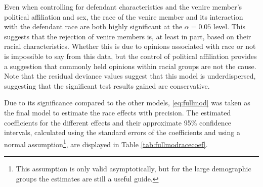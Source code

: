 Even when controlling for defendant characteristics and the venire member's political affiliation and sex, the race of the venire
member and its interaction with the defendant race are both highly significant at the $\alpha = 0.05$ level. This suggests that
the rejection of venire members is, at least in part, based on their racial characteristics. Whether this is due to opinions
associated with race or not is impossible to say from this data, but the control of political affiliation provides a suggestion
that commonly held opinions within racial groups are not the cause. Note that the residual deviance values suggest that this model
is underdispersed, suggesting that the significant test results gained are conservative.

Due to its significance compared to the other models, \ref{eq:fullmod} was taken as the final model to estimate the race effects
with precision. The estimated coefficients for the different effects and their approximate 95\% confidence intervals, calculated
using the standard errors of the coefficients and using a normal assumption\footnote{This assumption is only valid asymptotically,
  but for the large demographic groups the estimates are still a useful guide.}, are displayed in Table
\ref{tab:fullmodracecoef}.

